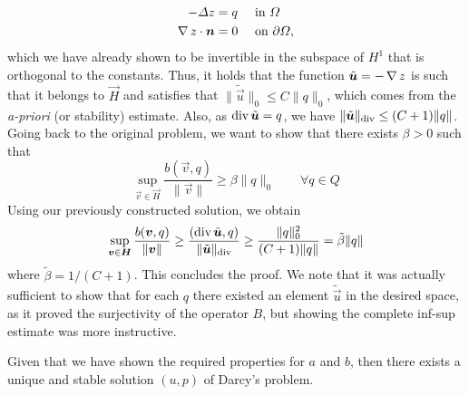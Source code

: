 \begin{itemize}
    \begin{equation}
        \begin{aligned}
            - \Delta z &= q && \tin \Omega \\
            \grad z\cdot \vec n &= 0 &&\ton \partial\Omega,
        \end{aligned}
    \end{equation}
    which we have already shown to be invertible in the subspace of $H^1$ that is orthogonal to the constants. Thus, it holds that the function $\tilde{\vec u} = -\grad z$ is such that it belongs to $\vec H$ and satisfies that $\|\tilde{\vec u}\|_0 \leq C \| q\|_0$, which comes from the \emph{a-priori} (or stability) estimate. Also, as $\dive \tilde{\vec u} = q$, we have $\|\tilde{\vec u}\|_{\dive} \leq (C+1)\|q\|$. Going back to the original problem, we want to show that there exists $\beta>0$ such that
    \begin{equation}
        \sup_{\vec v\in \vec H}\frac{b(\vec v, q)}{\|\vec v\|} \geq \beta \|q\|_0 \qquad \forall q \in Q
    \end{equation}
    Using our previously constructed solution, we obtain
    \begin{equation}
        \sup_{\vec v\in \vec H}\frac{b(\vec v, q)}{\|\vec v\|} \geq \frac{(\dive \tilde{\vec u}, q)}{\|\tilde{\vec u}\|_{\dive}}\geq \frac{\|q\|_0^2}{(C+1)\|q\|} = \tilde\beta \|q\|
    \end{equation}
    where $\tilde \beta = 1/(C+1)$. This concludes the proof. We note that it was actually sufficient to show that for each $q$ there existed an element $\tilde{\vec u}$ in the desired space, as it proved the surjectivity of the operator $B$, but showing the complete inf-sup estimate was more instructive. 
\end{itemize}
Given that we have shown the required properties for $a$ and $b$, then there exists a unique and stable solution $(u,p)$ of Darcy's problem.
